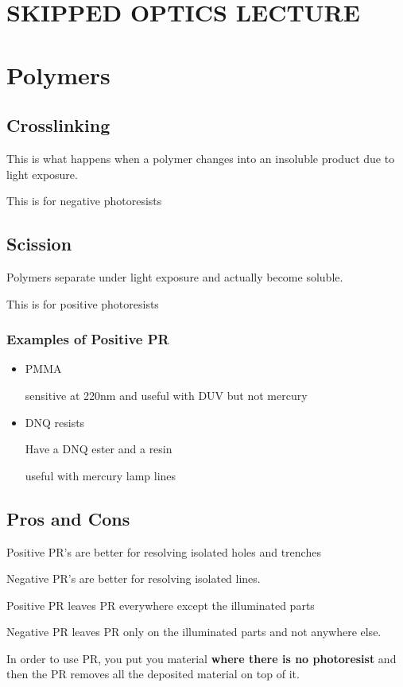 \documentclass[fleqn]{report}
\begin{document}
\chapter{SKIPPED OPTICS LECTURE}


\chapter{Polymers}

\section{Crosslinking}
This is what happens when a polymer changes into an insoluble 
product due to light exposure.

This is for negative photoresists

\section{Scission}
Polymers separate under light exposure and actually become soluble.

This is for positive photoresists

\subsection{Examples of Positive PR}
\begin{itemize}
    \item 
    PMMA

    sensitive at 220nm and useful with DUV but not mercury 
    \item 
    DNQ resists

    Have a DNQ ester and a resin 

    useful with mercury lamp lines 
\end{itemize}

\section{Pros and Cons}
Positive PR's are better for resolving isolated holes and trenches 

Negative PR's are better for resolving isolated lines.

Positive PR leaves PR everywhere except the illuminated parts 

Negative PR leaves PR only on the illuminated parts and not anywhere else.

In order to use PR, you put you material \textbf{where there is no 
photoresist} and then the PR removes all the deposited material on top 
of it.
\end{document}
